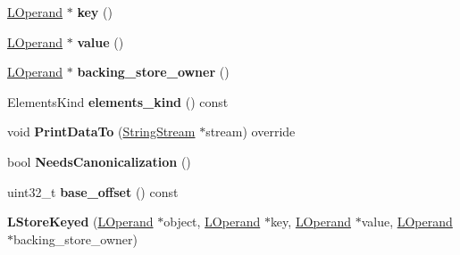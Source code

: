 \begin{DoxyCompactItemize}
\item 
\hyperlink{classv8_1_1internal_1_1_l_operand}{L\+Operand} $\ast$ {\bfseries key} ()\hypertarget{classv8_1_1internal_1_1_l_store_keyed_a768f44140c1abab8ec345ef73cb417ea}{}\label{classv8_1_1internal_1_1_l_store_keyed_a768f44140c1abab8ec345ef73cb417ea}

\item 
\hyperlink{classv8_1_1internal_1_1_l_operand}{L\+Operand} $\ast$ {\bfseries value} ()\hypertarget{classv8_1_1internal_1_1_l_store_keyed_a6a97e536a0eed02971eb915a57b6e898}{}\label{classv8_1_1internal_1_1_l_store_keyed_a6a97e536a0eed02971eb915a57b6e898}

\item 
\hyperlink{classv8_1_1internal_1_1_l_operand}{L\+Operand} $\ast$ {\bfseries backing\+\_\+store\+\_\+owner} ()\hypertarget{classv8_1_1internal_1_1_l_store_keyed_a21d192f5ddd6bbb5198880a6e2d03db3}{}\label{classv8_1_1internal_1_1_l_store_keyed_a21d192f5ddd6bbb5198880a6e2d03db3}

\item 
Elements\+Kind {\bfseries elements\+\_\+kind} () const \hypertarget{classv8_1_1internal_1_1_l_store_keyed_a09fd8ff5055daa16ec86a8f9bf4a1388}{}\label{classv8_1_1internal_1_1_l_store_keyed_a09fd8ff5055daa16ec86a8f9bf4a1388}

\item 
void {\bfseries Print\+Data\+To} (\hyperlink{classv8_1_1internal_1_1_string_stream}{String\+Stream} $\ast$stream) override\hypertarget{classv8_1_1internal_1_1_l_store_keyed_a6904d9c0c8c7e81ec9aab35f73978d38}{}\label{classv8_1_1internal_1_1_l_store_keyed_a6904d9c0c8c7e81ec9aab35f73978d38}

\item 
bool {\bfseries Needs\+Canonicalization} ()\hypertarget{classv8_1_1internal_1_1_l_store_keyed_a638212d8d0abef68447e1451b452ac14}{}\label{classv8_1_1internal_1_1_l_store_keyed_a638212d8d0abef68447e1451b452ac14}

\item 
uint32\+\_\+t {\bfseries base\+\_\+offset} () const \hypertarget{classv8_1_1internal_1_1_l_store_keyed_aa88021608606f53948b262edeccda1e6}{}\label{classv8_1_1internal_1_1_l_store_keyed_aa88021608606f53948b262edeccda1e6}

\item 
{\bfseries L\+Store\+Keyed} (\hyperlink{classv8_1_1internal_1_1_l_operand}{L\+Operand} $\ast$object, \hyperlink{classv8_1_1internal_1_1_l_operand}{L\+Operand} $\ast$key, \hyperlink{classv8_1_1internal_1_1_l_operand}{L\+Operand} $\ast$value, \hyperlink{classv8_1_1internal_1_1_l_operand}{L\+Operand} $\ast$backing\+\_\+store\+\_\+owner)\hypertarget{classv8_1_1internal_1_1_l_store_keyed_a40acd77f50898d8601b8587509f6443f}{}\label{classv8_1_1internal_1_1_l_store_keyed_a40acd77f50898d8601b8587509f6443f}


\end{DoxyCompactItemize}
